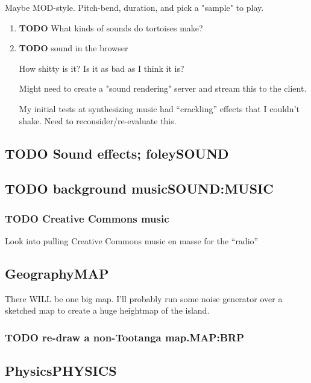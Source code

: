 \documentclass[11pt]{article}
\begin{document}
Maybe MOD-style. Pitch-bend, duration, and pick a "sample" to play.

\begin{enumerate}
\item {\bfseries\sffamily TODO} What kinds of sounds do tortoises make?
\label{sec-1-10-1-1}

\item {\bfseries\sffamily TODO} sound in the browser
\label{sec-1-10-1-2}

How shitty is it? Is it as bad as I think it is?

Might need to create a "sound rendering" server and stream this to
the client.

My initial tests at synthesizing music had “crackling” effects that I
couldn't shake. Need to reconsider/re-evaluate this.
\end{enumerate}
\subsection{{\bfseries\sffamily TODO} Sound effects; foley\hfill{}\textsc{SOUND}}
\label{sec-1-11}
\subsection{{\bfseries\sffamily TODO} background music\hfill{}\textsc{SOUND:MUSIC}}
\label{sec-1-12}
\subsubsection{{\bfseries\sffamily TODO} Creative Commons music}
\label{sec-1-12-1}

Look into pulling Creative Commons music en masse for the “radio”
\subsection{Geography\hfill{}\textsc{MAP}}
\label{sec-1-13}

There WILL be one big map. I'll probably run some noise generator over
a sketched map to create a huge heightmap of the island.

\subsubsection{{\bfseries\sffamily TODO} re-draw a non-Tootanga map.\hfill{}\textsc{MAP:BRP}}
\label{sec-1-13-1}
\subsection{Physics\hfill{}\textsc{PHYSICS}}
\label{sec-1-14}
\end{document}
